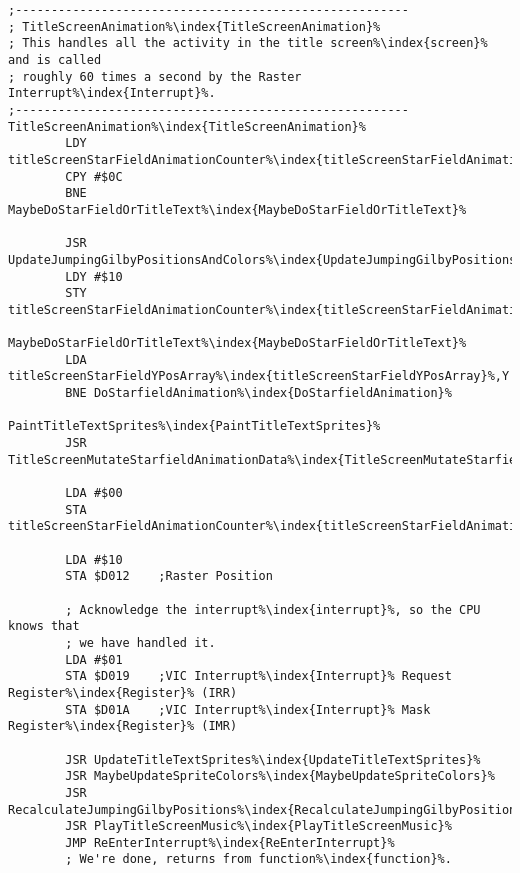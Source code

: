 \begin{lstlisting}[caption=\icode{TitleScreenAnimation\index{TitleScreenAnimation}} responsible for choosing what to do at each interrupt\index{interrupt}. ,escapechar=\%]
;-------------------------------------------------------
; TitleScreenAnimation%\index{TitleScreenAnimation}%
; This handles all the activity in the title screen%\index{screen}% and is called
; roughly 60 times a second by the Raster Interrupt%\index{Interrupt}%.
;-------------------------------------------------------
TitleScreenAnimation%\index{TitleScreenAnimation}%
        LDY titleScreenStarFieldAnimationCounter%\index{titleScreenStarFieldAnimationCounter}%
        CPY #$0C
        BNE MaybeDoStarFieldOrTitleText%\index{MaybeDoStarFieldOrTitleText}%

        JSR UpdateJumpingGilbyPositionsAndColors%\index{UpdateJumpingGilbyPositionsAndColors}%
        LDY #$10
        STY titleScreenStarFieldAnimationCounter%\index{titleScreenStarFieldAnimationCounter}%

MaybeDoStarFieldOrTitleText%\index{MaybeDoStarFieldOrTitleText}%   
        LDA titleScreenStarFieldYPosArray%\index{titleScreenStarFieldYPosArray}%,Y
        BNE DoStarfieldAnimation%\index{DoStarfieldAnimation}%

PaintTitleTextSprites%\index{PaintTitleTextSprites}%
        JSR TitleScreenMutateStarfieldAnimationData%\index{TitleScreenMutateStarfieldAnimationData}%

        LDA #$00
        STA titleScreenStarFieldAnimationCounter%\index{titleScreenStarFieldAnimationCounter}%

        LDA #$10
        STA $D012    ;Raster Position

        ; Acknowledge the interrupt%\index{interrupt}%, so the CPU knows that
        ; we have handled it.
        LDA #$01
        STA $D019    ;VIC Interrupt%\index{Interrupt}% Request Register%\index{Register}% (IRR)
        STA $D01A    ;VIC Interrupt%\index{Interrupt}% Mask Register%\index{Register}% (IMR)

        JSR UpdateTitleTextSprites%\index{UpdateTitleTextSprites}%
        JSR MaybeUpdateSpriteColors%\index{MaybeUpdateSpriteColors}%
        JSR RecalculateJumpingGilbyPositions%\index{RecalculateJumpingGilbyPositions}%
        JSR PlayTitleScreenMusic%\index{PlayTitleScreenMusic}%
        JMP ReEnterInterrupt%\index{ReEnterInterrupt}%
        ; We're done, returns from function%\index{function}%.
\end{lstlisting}

